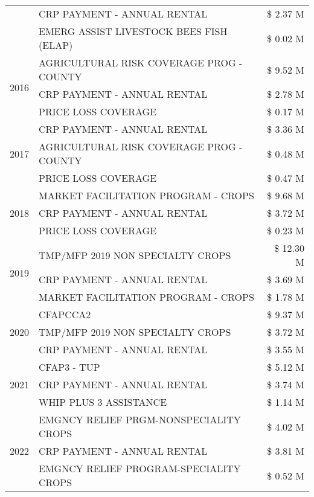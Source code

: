 \begin{tabular}{llr}
 & CRP PAYMENT - ANNUAL RENTAL & \$ 2.37 M \\
 & EMERG ASSIST LIVESTOCK BEES FISH (ELAP) & \$ 0.02 M \\
\cline{1-3}
\multirow[t]{3}{*}{2016} & AGRICULTURAL RISK COVERAGE PROG - COUNTY & \$ 9.52 M \\
 & CRP PAYMENT - ANNUAL RENTAL & \$ 2.78 M \\
 & PRICE LOSS COVERAGE & \$ 0.17 M \\
\cline{1-3}
\multirow[t]{3}{*}{2017} & CRP PAYMENT - ANNUAL RENTAL & \$ 3.36 M \\
 & AGRICULTURAL RISK COVERAGE PROG - COUNTY & \$ 0.48 M \\
 & PRICE LOSS COVERAGE & \$ 0.47 M \\
\cline{1-3}
\multirow[t]{3}{*}{2018} & MARKET FACILITATION PROGRAM - CROPS & \$ 9.68 M \\
 & CRP PAYMENT - ANNUAL RENTAL & \$ 3.72 M \\
 & PRICE LOSS COVERAGE & \$ 0.23 M \\
\cline{1-3}
\multirow[t]{3}{*}{2019} & TMP/MFP 2019 NON SPECIALTY CROPS & \$ 12.30 M \\
 & CRP PAYMENT - ANNUAL RENTAL & \$ 3.69 M \\
 & MARKET FACILITATION PROGRAM - CROPS & \$ 1.78 M \\
\cline{1-3}
\multirow[t]{3}{*}{2020} & CFAPCCA2 & \$ 9.37 M \\
 & TMP/MFP 2019 NON SPECIALTY CROPS & \$ 3.72 M \\
 & CRP PAYMENT - ANNUAL RENTAL & \$ 3.55 M \\
\cline{1-3}
\multirow[t]{3}{*}{2021} & CFAP3 - TUP & \$ 5.12 M \\
 & CRP PAYMENT - ANNUAL RENTAL & \$ 3.74 M \\
 & WHIP PLUS 3 ASSISTANCE & \$ 1.14 M \\
\cline{1-3}
\multirow[t]{3}{*}{2022} & EMGNCY RELIEF PRGM-NONSPECIALITY CROPS & \$ 4.02 M \\
 & CRP PAYMENT - ANNUAL RENTAL & \$ 3.81 M \\
 & EMGNCY RELIEF PROGRAM-SPECIALITY CROPS & \$ 0.52 M \\
\cline{1-3}
\bottomrule
\end{tabular}

